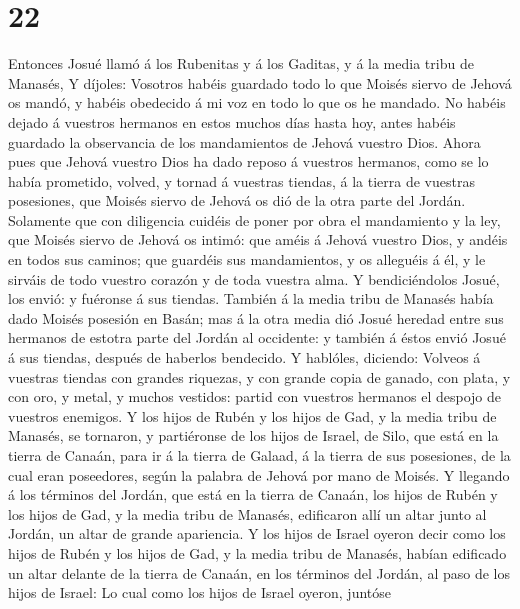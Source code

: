 \hypertarget{section-21}{%
\section{22}\label{section-21}}

 Entonces Josué llamó á los Rubenitas y á los Gaditas, y á
la media tribu de Manasés,  Y díjoles: Vosotros habéis
guardado todo lo que Moisés siervo de Jehová os mandó, y habéis
obedecido á mi voz en todo lo que os he mandado.  No
habéis dejado á vuestros hermanos en estos muchos días hasta hoy, antes
habéis guardado la observancia de los mandamientos de Jehová vuestro
Dios.  Ahora pues que Jehová vuestro Dios ha dado reposo á
vuestros hermanos, como se lo había prometido, volved, y tornad á
vuestras tiendas, á la tierra de vuestras posesiones, que Moisés siervo
de Jehová os dió de la otra parte del Jordán.  Solamente
que con diligencia cuidéis de poner por obra el mandamiento y la ley,
que Moisés siervo de Jehová os intimó: que améis á Jehová vuestro Dios,
y andéis en todos sus caminos; que guardéis sus mandamientos, y os
alleguéis á él, y le sirváis de todo vuestro corazón y de toda vuestra
alma.  Y bendiciéndolos Josué, los envió: y fuéronse á sus
tiendas.  También á la media tribu de Manasés había dado
Moisés posesión en Basán; mas á la otra media dió Josué heredad entre
sus hermanos de estotra parte del Jordán al occidente: y también á éstos
envió Josué á sus tiendas, después de haberlos bendecido. 
Y hablóles, diciendo: Volveos á vuestras tiendas con grandes riquezas, y
con grande copia de ganado, con plata, y con oro, y metal, y muchos
vestidos: partid con vuestros hermanos el despojo de vuestros enemigos.
 Y los hijos de Rubén y los hijos de Gad, y la media tribu
de Manasés, se tornaron, y partiéronse de los hijos de Israel, de Silo,
que está en la tierra de Canaán, para ir á la tierra de Galaad, á la
tierra de sus posesiones, de la cual eran poseedores, según la palabra
de Jehová por mano de Moisés.  Y llegando á los términos
del Jordán, que está en la tierra de Canaán, los hijos de Rubén y los
hijos de Gad, y la media tribu de Manasés, edificaron allí un altar
junto al Jordán, un altar de grande apariencia.  Y los
hijos de Israel oyeron decir como los hijos de Rubén y los hijos de Gad,
y la media tribu de Manasés, habían edificado un altar delante de la
tierra de Canaán, en los términos del Jordán, al paso de los hijos de
Israel:  Lo cual como los hijos de Israel oyeron, juntóse
